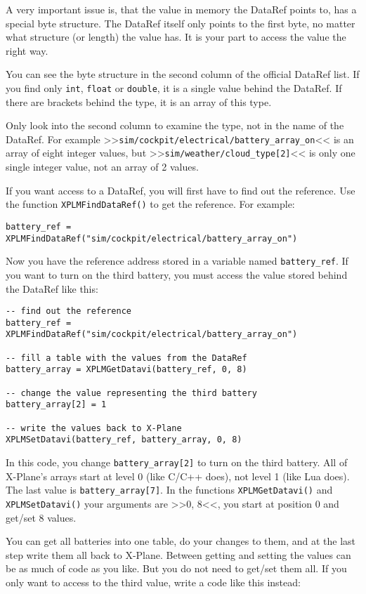 \documentclass[11pt,parskip=half,a4paper]{scrartcl}
\begin{document}
A very important issue is, that the value in memory the DataRef points to, has a special byte structure. The DataRef itself only points to the first byte, no matter what structure (or length) the value has. It is your part to access the value the right way.

You can see the byte structure in the second column of the official DataRef list. If you find only \verb|int|, \verb|float| or \verb|double|, it is a single value behind the DataRef. If there are brackets behind the type, it is an array of this type.

Only look into the second column to examine the type, not in the name of the DataRef. For example >>\verb|sim/cockpit/electrical/battery_array_on|<< is an array of eight integer values, but >>\verb|sim/weather/cloud_type[2]|<< is only one single integer value, not an array of 2 values.

If you want access to a DataRef, you will first have to find out the reference. Use the function \verb|XPLMFindDataRef()| to get the reference. For example:

\verb|battery_ref = XPLMFindDataRef("sim/cockpit/electrical/battery_array_on")|

Now you have the reference address stored in a variable named \verb|battery_ref|. If you want to turn on the third battery, you must access the value stored behind the DataRef like this:

\begin{lstlisting}
-- find out the reference
battery_ref = XPLMFindDataRef("sim/cockpit/electrical/battery_array_on")

-- fill a table with the values from the DataRef
battery_array = XPLMGetDatavi(battery_ref, 0, 8)

-- change the value representing the third battery
battery_array[2] = 1

-- write the values back to X-Plane
XPLMSetDatavi(battery_ref, battery_array, 0, 8)
\end{lstlisting}

In this code, you change \verb|battery_array[2]| to turn on the third battery. All of X-Plane's arrays start at level 0 (like C/C++ does), not level 1 (like Lua does). The last value is \verb|battery_array[7]|. In the functions \verb|XPLMGetDatavi()| and \verb|XPLMSetDatavi()| your arguments are >>0, 8<<, you start at position 0 and get/set 8 values.

You can get all batteries into one table, do your changes to them, and at the last step write them all back to X-Plane. Between getting and setting the values can be as much of code as you like. But you do not need to get/set them all. If you only want to access to the third value, write a code like this instead:
\end{document}

